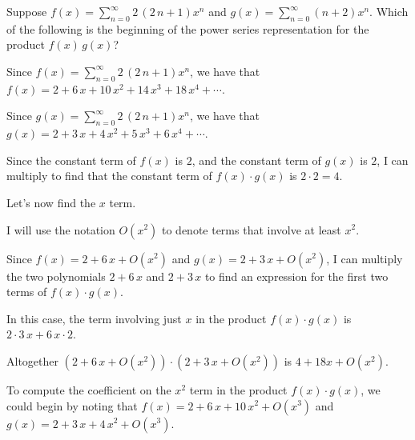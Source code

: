 \documentclass{ximera}
\begin{document}
\begin{question}
  Suppose \(f(x) = \displaystyle\sum_{n=0}^\infty 2 \, {\left(2 \, n + 1\right)} x^{n}\) and \(g(x) = \displaystyle\sum_{n=0}^\infty {\left(n + 2\right)} x^{n}\).  Which of the following is the beginning of the power series representation for the product \(f(x) \, g(x)\)?
  
  \begin{solution}
    \begin{hint}
      Since \(f(x) = \displaystyle\sum_{n=0}^\infty 2 \, {\left(2 \, n + 1\right)} x^{n}\), we have that \(f(x) =  2+ 6 \, x + 10 \, x^{2} + 14 \, x^{3} +18 \, x^{4}  + \cdots\).
    \end{hint}
    \begin{hint}
      Since \(g(x) = \displaystyle\sum_{n=0}^\infty 2 \, {\left(2 \, n + 1\right)} x^{n}\), we have that \(g(x) =  2+ 3 \, x + 4 \, x^{2} + 5 \, x^{3} +6 \, x^{4}  + \cdots\).
    \end{hint}
    \begin{hint}
      Since the constant term of \(f(x)\) is \(2\), and the constant term of \(g(x)\) is \(2\), I can multiply to find that the constant term of \(f(x) \cdot g(x)\) is \(2 \cdot 2 = 4\).
    \end{hint}
    \begin{hint}
      Let's now find the \(x\) term.
    \end{hint}
    \begin{hint}
      I will use the notation \(O(x^2)\) to denote terms that involve at least \(x^2\).
    \end{hint}
    \begin{hint}
      Since \(f(x) = 2 + 6 \, x + O(x^2)\) and \(g(x) = 2 + 3 \, x + O(x^2)\), I can multiply the two polynomials \( 2 + 6 \, x\) and \(2 + 3 \, x\) to find an expression for the first two terms of \(f(x) \cdot g(x)\).
    \end{hint}
    \begin{hint}
      In this case, the term involving just \(x\) in the product \(f(x) \cdot g(x)\) is \( 2 \cdot 3 \, x + 6 \, x \cdot 2 \).
    \end{hint}
    \begin{hint}
      Altogether \( \left( 2 + 6 \, x + O(x^2) \right) \cdot \left( 2 + 3 \, x + O(x^2) \right)\) is \( 4+18 x  + O(x^2)\).
    \end{hint}
    \begin{hint}
      To compute the coefficient on the \(x^2\) term in the product \(f(x) \cdot g(x)\), we could begin by noting that \(f(x) = 2 + 6 \, x + 10 \, x^{2} + O(x^3)\) and \(g(x) = 2 + 3 \, x + 4 \, x^{2} + O(x^3)\).

\end{hint}
\end{solution}
\end{question}
\end{document}
